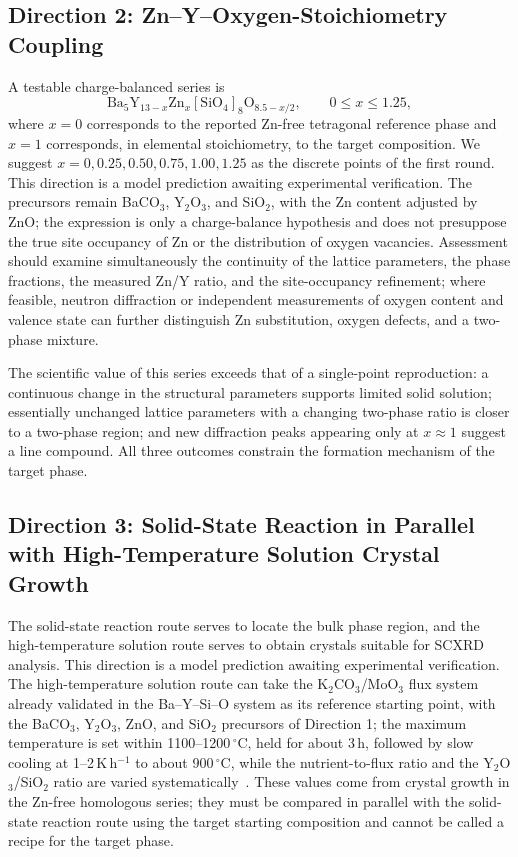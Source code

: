 \subsection{Direction 2: Zn--Y--Oxygen-Stoichiometry Coupling}

A testable charge-balanced series is
\[
\mathrm{Ba_5Y_{13-\mathit{x}}Zn_{\mathit{x}}[SiO_4]_8O_{8.5-\mathit{x}/2}},
\qquad 0\leq x\leq1.25,
\]
where $x=0$ corresponds to the reported Zn-free tetragonal reference phase and $x=1$ corresponds, in elemental stoichiometry, to the target composition. We suggest $x=0,0.25,0.50,0.75,1.00,1.25$ as the discrete points of the first round. This direction is a model prediction awaiting experimental verification. The precursors remain BaCO$_3$, Y$_2$O$_3$, and SiO$_2$, with the Zn content adjusted by ZnO; the expression is only a charge-balance hypothesis and does not presuppose the true site occupancy of Zn or the distribution of oxygen vacancies. Assessment should examine simultaneously the continuity of the lattice parameters, the phase fractions, the measured Zn\slash Y ratio, and the site-occupancy refinement; where feasible, neutron diffraction or independent measurements of oxygen content and valence state can further distinguish Zn substitution, oxygen defects, and a two-phase mixture.

The scientific value of this series exceeds that of a single-point reproduction: a continuous change in the structural parameters supports limited solid solution; essentially unchanged lattice parameters with a changing two-phase ratio is closer to a two-phase region; and new diffraction peaks appearing only at $x\approx1$ suggest a line compound. All three outcomes constrain the formation mechanism of the target phase.

\subsection{Direction 3: Solid-State Reaction in Parallel with High-Temperature Solution Crystal Growth}

The solid-state reaction route serves to locate the bulk phase region, and the high-temperature solution route serves to obtain crystals suitable for SCXRD analysis. This direction is a model prediction awaiting experimental verification. The high-temperature solution route can take the K$_2$CO$_3$\slash MoO$_3$ flux system already validated in the Ba--Y--Si--O system as its reference starting point, with the BaCO$_3$, Y$_2$O$_3$, ZnO, and SiO$_2$ precursors of Direction 1; the maximum temperature is set within 1100--1200\,$^\circ$C, held for about 3\,h, followed by slow cooling at 1--2\,K\,h$^{-1}$ to about 900\,$^\circ$C, while the nutrient-to-flux ratio and the Y$_2$O$_3$\slash SiO$_2$ ratio are varied systematically~\cite{kolitsch2009crystal,wierzbickawieczorek2017high}. These values come from crystal growth in the Zn-free homologous series; they must be compared in parallel with the solid-state reaction route using the target starting composition and cannot be called a recipe for the target phase.

